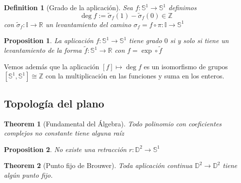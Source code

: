\documentclass[leqno]{article}
\newtheorem*{definition}{Definition}
\newtheorem*{theorem}{Theorem}
\newtheorem*{proposition}{Proposition}
\begin{document}
\begin{minipage}{0.8\textwidth}
\begin{definition}[Grado de la aplicación] Sea $f:\mathbb{S}^1 \to  \mathbb{S}^1$ definimos
  \[
  \deg f:= \tilde{\sigma }_f(1) - \tilde{\sigma }_f(0) \in \mathbb{Z}
  \] 
  con $\tilde{\sigma }_f:\mathbb{I} \to  \mathbb{R}$ un levantamiento del camino $\sigma _f = f \circ \pi : \mathbb{I} \to  \mathbb{S}^1$
\end{definition}
\end{minipage}
\begin{minipage}{0.2\textwidth}
\end{minipage}

\begin{proposition}
La aplicación $f:  \mathbb{S}^1 \to  \mathbb{S}^1 $ tiene grado $0$ si y solo si tiene un levantamiento de la forma $\tilde{f}: \mathbb{S}^1 \to  \mathbb{R}$ con $f=\exp \circ \tilde{f}$
\end{proposition}

Vemos además que la aplicación $[f] \mapsto \deg f$ es un isomorfismo de grupos $[\mathbb{S}^1, \mathbb{S}^1] \cong \mathbb{Z}$ con la multiplicación en las funciones y suma en los enteros.

\subsection{Topología del plano}
\begin{theorem}[Fundamental del Álgebra] Todo polinomio con coeficientes complejos no constante tiene alguna raíz
\end{theorem}

\begin{proposition}
No existe una retracción $r:\mathbb{D}^2 \to \mathbb{S}^1$
\end{proposition}

\begin{theorem}[Punto fijo de Brouwer]
Toda aplicación continua $\mathbb{D}^2 \to \mathbb{D}^2$ tiene algún punto fijo.
\end{theorem}
\end{document}
